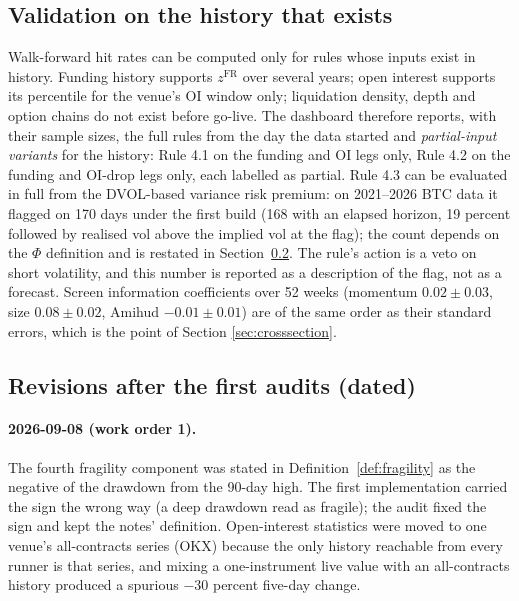 \documentclass[11pt,a4paper]{article}
\theoremstyle{definition}
\begin{document}
\subsection{Validation on the history that exists}\label{sec:impl-validation}

Walk-forward hit rates can be computed only for rules whose inputs exist in history. Funding history supports $z^{\mathrm{FR}}$ over several years; open interest supports its percentile for the venue's OI window only; liquidation density, depth and option chains do not exist before go-live. The dashboard therefore reports, with their sample sizes, the full rules from the day the data started and \emph{partial-input variants} for the history: Rule 4.1 on the funding and OI legs only, Rule 4.2 on the funding and OI-drop legs only, each labelled as partial. Rule 4.3 can be evaluated in full from the DVOL-based variance risk premium: on 2021--2026 BTC data it flagged on 170 days under the first build (168 with an elapsed horizon, 19 percent followed by realised vol above the implied vol at the flag); the count depends on the $\Phi$ definition and is restated in Section~\ref{sec:impl-revisions}. The rule's action is a veto on short volatility, and this number is reported as a description of the flag, not as a forecast. Screen information coefficients over 52 weeks (momentum $0.02 \pm 0.03$, size $0.08 \pm 0.02$, Amihud $-0.01 \pm 0.01$) are of the same order as their standard errors, which is the point of Section \ref{sec:crosssection}.

\subsection{Revisions after the first audits (dated)}\label{sec:impl-revisions}

\paragraph{2026-09-08 (work order 1).} The fourth fragility component was stated in Definition~\ref{def:fragility} as the negative of the drawdown from the 90-day high. The first implementation carried the sign the wrong way (a deep drawdown read as fragile); the audit fixed the sign and kept the notes' definition. Open-interest statistics were moved to one venue's all-contracts series (OKX) because the only history reachable from every runner is that series, and mixing a one-instrument live value with an all-contracts history produced a spurious $-30$ percent five-day change.
\end{document}
